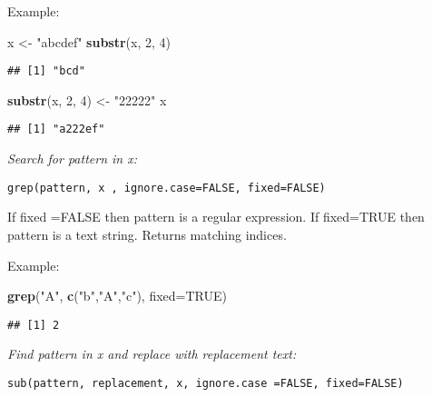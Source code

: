 \documentclass[]{book}
\newenvironment{Shaded}{\begin{snugshade}}{\end{snugshade}}
\newcommand{\KeywordTok}[1]{\textcolor[rgb]{0.13,0.29,0.53}{\textbf{#1}}}
\newcommand{\DataTypeTok}[1]{\textcolor[rgb]{0.13,0.29,0.53}{#1}}
\newcommand{\DecValTok}[1]{\textcolor[rgb]{0.00,0.00,0.81}{#1}}
\newcommand{\StringTok}[1]{\textcolor[rgb]{0.31,0.60,0.02}{#1}}
\newcommand{\OtherTok}[1]{\textcolor[rgb]{0.56,0.35,0.01}{#1}}
\newcommand{\NormalTok}[1]{#1}
\theoremstyle{definition}
\theoremstyle{definition}
\theoremstyle{definition}
\theoremstyle{remark}
\begin{document}
Example:

\begin{Shaded}
\begin{Highlighting}[]
\NormalTok{x <-}\StringTok{ "abcdef"} 
\KeywordTok{substr}\NormalTok{(x, }\DecValTok{2}\NormalTok{, }\DecValTok{4}\NormalTok{)  }
\end{Highlighting}
\end{Shaded}

\begin{verbatim}
## [1] "bcd"
\end{verbatim}

\begin{Shaded}
\begin{Highlighting}[]
\KeywordTok{substr}\NormalTok{(x, }\DecValTok{2}\NormalTok{, }\DecValTok{4}\NormalTok{) <-}\StringTok{ "22222"} 
\NormalTok{x}
\end{Highlighting}
\end{Shaded}

\begin{verbatim}
## [1] "a222ef"
\end{verbatim}

\emph{Search for pattern in x:}

\begin{verbatim}
grep(pattern, x , ignore.case=FALSE, fixed=FALSE)   
\end{verbatim}

If fixed =FALSE then pattern is a regular expression. If fixed=TRUE then
pattern is a text string. Returns matching indices.

Example:

\begin{Shaded}
\begin{Highlighting}[]
\KeywordTok{grep}\NormalTok{(}\StringTok{"A"}\NormalTok{, }\KeywordTok{c}\NormalTok{(}\StringTok{"b"}\NormalTok{,}\StringTok{"A"}\NormalTok{,}\StringTok{"c"}\NormalTok{), }\DataTypeTok{fixed=}\OtherTok{TRUE}\NormalTok{) }
\end{Highlighting}
\end{Shaded}

\begin{verbatim}
## [1] 2
\end{verbatim}

\emph{Find pattern in x and replace with replacement text:}

\begin{verbatim}
sub(pattern, replacement, x, ignore.case =FALSE, fixed=FALSE)   
\end{verbatim}
\end{document}
